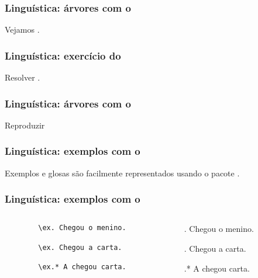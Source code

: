 \begin{frame}
  \frametitle{Linguística: árvores com o }
  \huge
  Vejamos .
\end{frame}

\begin{frame}
  \frametitle{Linguística: exercício do }
  \huge
  Resolver .
\end{frame}

\begin{frame}
  \frametitle{Linguística: árvores com o }
  \huge
  Reproduzir %
\end{frame}

\begin{frame}
  \frametitle{Linguística: exemplos com o }
  \huge
  Exemplos e glosas são facilmente representados usando o pacote
  .
\end{frame}

\begin{frame}[fragile]
  \frametitle{Linguística: exemplos com o }
  \large
  \begin{columns}
    \begin{column}{.5\textwidth}
      \begin{verbatim}
        \ex. Chegou o menino.

        \ex. Chegou a carta.

        \ex.* A chegou carta.
      \end{verbatim}
    \end{column} 
    \begin{column}{.5\textwidth}
      \ex. Chegou o menino.\par
      \ex. Chegou a carta.\par
      \ex.* A chegou carta.\par
    \end{column} 
  \end{columns}
\end{frame}

